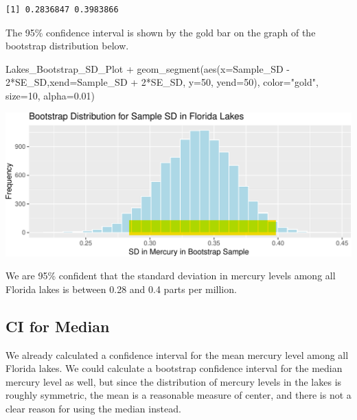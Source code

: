 \documentclass[
  letterpaper,
  DIV=11,
  numbers=noendperiod]{scrreprt}
\newenvironment{Shaded}{\begin{snugshade}}{\end{snugshade}}
\newcommand{\AttributeTok}[1]{\textcolor[rgb]{0.40,0.45,0.13}{#1}}
\newcommand{\DecValTok}[1]{\textcolor[rgb]{0.68,0.00,0.00}{#1}}
\newcommand{\FloatTok}[1]{\textcolor[rgb]{0.68,0.00,0.00}{#1}}
\newcommand{\FunctionTok}[1]{\textcolor[rgb]{0.28,0.35,0.67}{#1}}
\newcommand{\NormalTok}[1]{\textcolor[rgb]{0.00,0.23,0.31}{#1}}
\newcommand{\SpecialCharTok}[1]{\textcolor[rgb]{0.37,0.37,0.37}{#1}}
\newcommand{\StringTok}[1]{\textcolor[rgb]{0.13,0.47,0.30}{#1}}
\begin{document}
\begin{verbatim}
[1] 0.2836847 0.3983866
\end{verbatim}

The 95\% confidence interval is shown by the gold bar on the graph of
the bootstrap distribution below.

\begin{Shaded}
\begin{Highlighting}[]
\NormalTok{Lakes\_Bootstrap\_SD\_Plot }\SpecialCharTok{+} 
  \FunctionTok{geom\_segment}\NormalTok{(}\FunctionTok{aes}\NormalTok{(}\AttributeTok{x=}\NormalTok{Sample\_SD }\SpecialCharTok{{-}} \DecValTok{2}\SpecialCharTok{*}\NormalTok{SE\_SD,}\AttributeTok{xend=}\NormalTok{Sample\_SD }\SpecialCharTok{+} \DecValTok{2}\SpecialCharTok{*}\NormalTok{SE\_SD, }\AttributeTok{y=}\DecValTok{50}\NormalTok{, }\AttributeTok{yend=}\DecValTok{50}\NormalTok{), }
               \AttributeTok{color=}\StringTok{"gold"}\NormalTok{, }\AttributeTok{size=}\DecValTok{10}\NormalTok{, }\AttributeTok{alpha=}\FloatTok{0.01}\NormalTok{) }
\end{Highlighting}
\end{Shaded}

\includegraphics{Ch3_files/figure-pdf/unnamed-chunk-85-1.pdf}

We are 95\% confident that the standard deviation in mercury levels
among all Florida lakes is between 0.28 and 0.4 parts per million.

\subsection{CI for Median}\label{ci-for-median}

We already calculated a confidence interval for the mean mercury level
among all Florida lakes. We could calculate a bootstrap confidence
interval for the median mercury level as well, but since the
distribution of mercury levels in the lakes is roughly symmetric, the
mean is a reasonable measure of center, and there is not a clear reason
for using the median instead.
\end{document}
